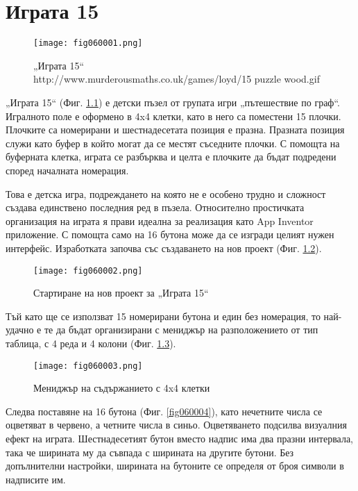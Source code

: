 ﻿\chapter{Играта 15}

\begin{figure}[H]
  \centering
  \texttt{[image: fig060001.png]}
  \caption{„Играта 15“ \\ http://www.murderousmaths.co.uk/games/loyd/15 puzzle wood.gif}
\label{fig060001}
\end{figure}

„Играта 15“ (Фиг. \ref{fig060001}) е детски пъзел от групата игри „пътешествие по граф“. Игралното поле е оформено в 4x4 клетки, като в него са поместени 15 плочки. Плочките са номерирани и шестнадесетата позиция е празна. Празната позиция служи като буфер в който могат да се местят съседните плочки. С помощта на буферната клетка, играта се разбърква и целта е плочките да бъдат подредени според началната номерация. 

Това е детска игра, подреждането на която не е особено трудно и сложност създава единствено последния ред в пъзела. Относително простичката организация на играта я прави идеална за реализация като App Inventor приложение. С помощта само на 16 бутона може да се изгради целият нужен интерфейс. Изработката започва със създаването на нов проект (Фиг. \ref{fig060002}).

\begin{figure}[H]
  \centering
  \texttt{[image: fig060002.png]}
  \caption{Стартиране на нов проект за „Играта 15“}
\label{fig060002}
\end{figure}

Тъй като ще се използват 15 номерирани бутона и един без номерация, то най-удачно е те да бъдат организирани с мениджър на разположението от тип таблица, с 4 реда и 4 колони (Фиг. \ref{fig060003}).

\begin{figure}[H]
  \centering
  \texttt{[image: fig060003.png]}
  \caption{Мениджър на съдържанието с 4x4 клетки}
\label{fig060003}
\end{figure}

Следва поставяне на 16 бутона (Фиг. \ref{fig060004}), като нечетните числа се оцветяват в червено, а четните числа в синьо. Оцветяването подсилва визуалния ефект на играта. Шестнадесетият бутон вместо надпис има два празни интервала, така че ширината му да съвпада с ширината на другите бутони. Без допълнителни настройки, ширината на бутоните се определя от броя символи в надписите им. 

